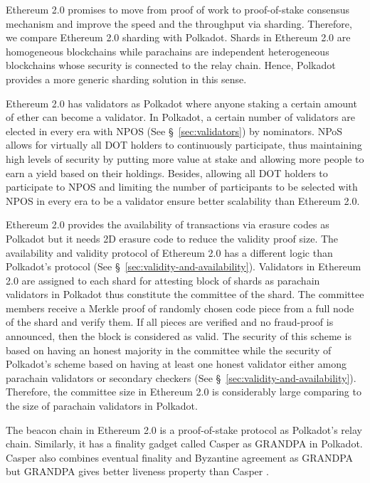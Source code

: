 Ethereum 2.0 promises to move from proof of work to proof-of-stake consensus mechanism and improve the speed and the throughput via sharding. Therefore, we compare Ethereum 2.0 sharding with Polkadot. Shards in Ethereum 2.0  are homogeneous blockchains while parachains are independent heterogeneous blockchains whose security is connected to the relay chain. Hence, Polkadot provides a more generic sharding solution in this sense. 

Ethereum 2.0 has validators as Polkadot where anyone staking a certain amount of ether can become a validator. In Polkadot, a certain number of validators are elected in every era with NPOS (See \S~\ref{sec:validators}) by nominators. NPoS allows for virtually all DOT holders to continuously participate, thus maintaining high levels of security by putting more value at stake and allowing more people to earn a yield based on their holdings. Besides, allowing all DOT holders to participate to NPOS and limiting the number of participants to be selected with NPOS in every era to be a validator ensure better scalability than Ethereum 2.0.

Ethereum 2.0 provides the availability of transactions via erasure codes as Polkadot but it needs 2D erasure code to reduce the validity proof size. The availability and validity protocol \cite{availabilityETH2} of Ethereum 2.0 has a different logic than Polkadot's protocol (See \S~\ref{sec:validity-and-availability}). Validators in Ethereum 2.0 are assigned to each shard for attesting block of shards as parachain validators in Polkadot thus constitute the committee of the shard. The committee members receive a Merkle proof of randomly chosen code piece from a full node of the shard and verify them. If all pieces are verified and no fraud-proof is announced, then the block is considered as valid. The security of this scheme is based on having an honest majority in the committee while the security of Polkadot's scheme based on having at least one honest validator either among parachain validators or secondary checkers (See \S~\ref{sec:validity-and-availability}). Therefore, the committee size in Ethereum 2.0 is considerably large comparing to the size of parachain validators in Polkadot. 

The beacon chain in Ethereum 2.0 is a proof-of-stake protocol as Polkadot's relay chain. Similarly, it has a finality gadget called Casper \cite{CasperFFG,CasperCBC} as GRANDPA in Polkadot. Casper also combines  eventual finality and  Byzantine agreement as GRANDPA but GRANDPA gives better liveness property than Casper \cite{2018:Stewart:Grandpa}.